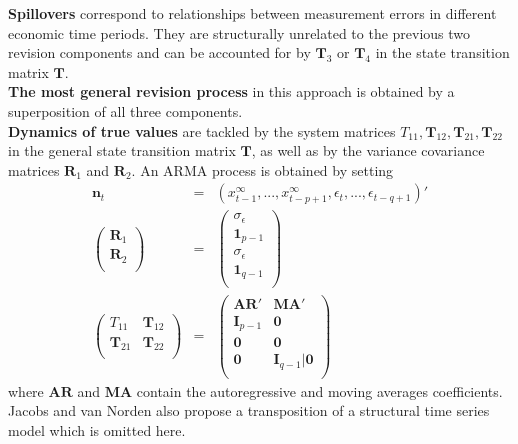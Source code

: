 \documentclass[11pt]{article}
\begin{document}
\textbf{Spillovers} correspond to relationships between measurement errors in different economic time periods. They are structurally unrelated to the previous two revision components and can be accounted for by $\textbf{T}_3$ or $\textbf{T}_4$ in the state transition matrix $\textbf{T}$. \\

\textbf{The most general revision process} in this approach is obtained by a superposition of all three components.\\

\textbf{Dynamics of true values} are tackled by the system matrices $T_{11},\textbf{T}_{12}, \textbf{T}_{21}, \textbf{T}_{22}$ in the general state transition matrix $\textbf{T}$, as well as by the variance covariance matrices $\textbf{R}_1$ and $\textbf{R}_2$. An ARMA process is obtained by setting \begin{eqnarray*}
\textbf{n}_t&=&(x_{t-1}^\infty,...,x_{t-p+1}^\infty,\epsilon_t,...,\epsilon_{t-q+1})'\\
\left(
  \begin{array}{c}
    \textbf{R}_1 \\
    \textbf{R}_2 \\
  \end{array}
\right)&=&\left(
            \begin{array}{c}
              \sigma_\epsilon \\
              \textbf{1}_{p-1} \\
              \sigma_\epsilon \\
              \textbf{1}_{q-1} \\
            \end{array}
          \right)\\
\left(
  \begin{array}{cc}
    T_{11} & \textbf{T}_{12} \\
    \textbf{T}_{21} & \textbf{T}_{22} \\
  \end{array}
\right)&=&\left(
            \begin{array}{cc}
              \textbf{AR}' & \textbf{MA}' \\
              \textbf{I}_{p-1} & \textbf{0} \\
              \textbf{0} & \textbf{0} \\
              \textbf{0} & \textbf{I}_{q-1}|\textbf{0} \\
            \end{array}
          \right)
\end{eqnarray*}
where $\textbf{AR}$ and $\textbf{MA}$ contain the autoregressive and moving averages coefficients. Jacobs and van Norden also propose a transposition of a structural time series model which is omitted here.\\
\end{document}
